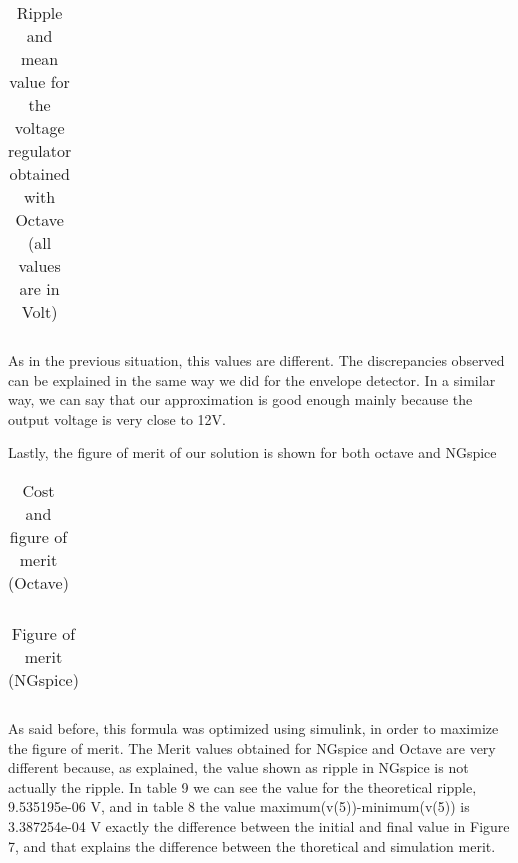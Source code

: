 \begin{table}[H]
\centering
\begin{tabularx}{0.9\textwidth} {
  | >{\raggedright\arraybackslash}X
  | >{\raggedleft\arraybackslash}X | }
 \hline

\end{tabularx}
\caption{\label{tab:Table 9} Ripple and mean value for the voltage regulator obtained with Octave (all values are in Volt)}
\end{table}
\vspace{5mm}

\par As in the previous situation, this values are different. The discrepancies observed can be explained in the same way we did for the envelope detector. In a similar way, we can say that our approximation is good enough mainly because the output voltage is very close to 12V.
\par Lastly, the figure of merit of our solution is shown for both octave and NGspice

\vspace{5mm}
\begin{table}[H]
\centering
\begin{tabularx}{0.9\textwidth} {
  | >{\raggedright\arraybackslash}X
  | >{\raggedleft\arraybackslash}X | }
 \hline

\end{tabularx}
\caption{\label{tab:Table 10} Cost and figure of merit (Octave)}
\end{table}
\vspace{5mm}

\vspace{5mm}
\begin{table}[H]
\centering
\begin{tabularx}{0.9\textwidth} {
  | >{\raggedright\arraybackslash}X
  | >{\raggedleft\arraybackslash}X | }
 \hline

\end{tabularx}
\caption{\label{tab:Table 11} Figure of merit (NGspice)}
\end{table}
\vspace{5mm}

\par As said before, this formula was optimized using simulink, in order to maximize the figure of merit. The Merit values obtained for NGspice and Octave are very different because, as explained, the value shown as ripple in NGspice is not actually the ripple. In table 9 we can see the value for the theoretical ripple, 9.535195e-06 V, and in table 8 the value maximum(v(5))-minimum(v(5)) is 3.387254e-04 V exactly the difference between the initial and final value in Figure 7, and that explains the difference between the thoretical and simulation merit. 
